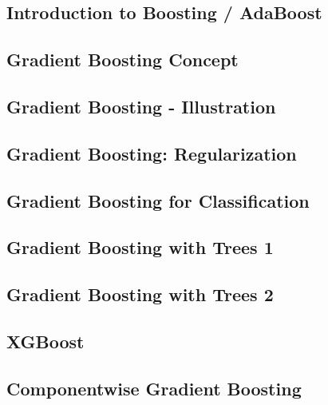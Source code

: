 




\subsection{Introduction to Boosting / AdaBoost}


\subsection{Gradient Boosting Concept}


\subsection{Gradient Boosting - Illustration}


\subsection{Gradient Boosting: Regularization}


\subsection{Gradient Boosting for Classification}


\subsection{Gradient Boosting with Trees 1}


\subsection{Gradient Boosting with Trees 2}


\subsection{XGBoost}


\subsection{Componentwise Gradient Boosting}









